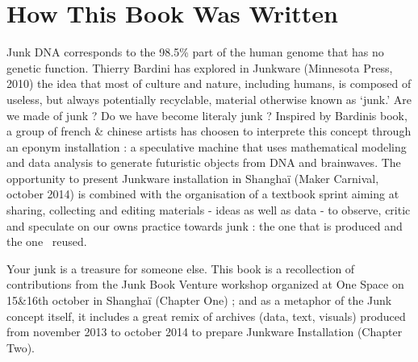 \section{How This Book Was Written}
Junk DNA corresponds to the 98.5\% part of the human genome that has no
genetic function. Thierry Bardini has explored in Junkware (Minnesota
Press, 2010) the idea that {\textquotedbl}most of culture and nature,
including humans, is composed of useless, but always potentially
recyclable, material otherwise known as
{\textquoteleft}junk.{\textquoteright} {\textquotedbl}\newline
Are we made of junk ? Do we have become literaly junk ? \newline
\newline
Inspired by Bardini{\textquotesingle}s book, a group of french \&
chinese artists has choosen to interprete this concept through an
eponym installation : a speculative machine that uses mathematical
modeling and data analysis to generate futuristic objects from DNA and
brainwaves. \newline
\newline
The opportunity to present Junkware installation in Shangha\"i (Maker
Carnival, october 2014) is combined with the organisation of a textbook
sprint aiming at sharing, collecting and editing materials - ideas as
well as data - to observe, critic and speculate on our
own{\textquotesingle}s practice towards junk : the one that is produced
and the one~ reused. 

Your junk is a treasure for someone else. \newline
\newline
This book is a recollection of contributions from the Junk Book Venture
workshop organized at One Space on 15\&16th october in Shangha\"i
(Chapter One) ; and as a metaphor of the Junk concept itself, it
includes a great remix of archives (data, text, visuals) produced from
november 2013 to october 2014 to prepare Junkware Installation (Chapter
Two).

